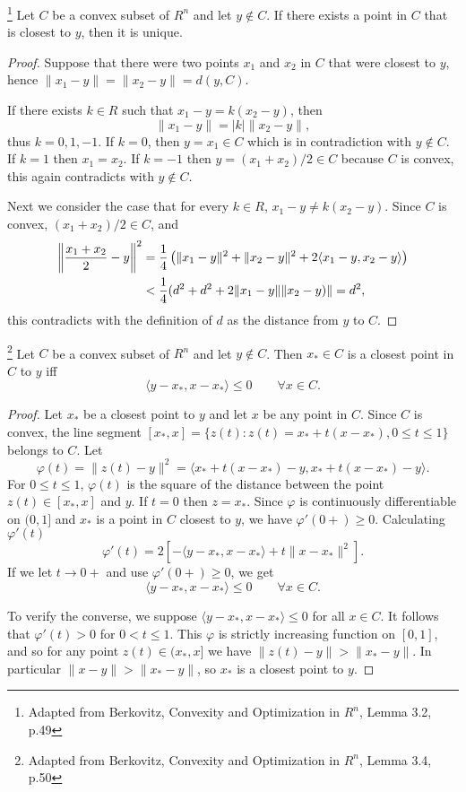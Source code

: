 \begin{lemma}
\footnote{Adapted from Berkovitz, Convexity and Optimization in $R^n$, Lemma
          3.2, p.49}
Let $C$ be a convex subset of $R^n$ and let $y\notin C$. If there exists a 
point in $C$ that is closest to $y$, then it is unique.
\end{lemma}
\begin{proof}
Suppose that there were two points $x_1$ and $x_2$ in $C$ that were closest 
to $y$, hence $\| x_1-y \| = \| x_2-y \| = d(y,C)$.

If there exists $k\in R$ such that $x_1-y=k(x_2-y)$, then
\[
  \| x_1-y \| = |k| \| x_2-y \|,
\]
thus $k=0,1,-1$. If $k=0$, then $y=x_1\in C$ which is in contradiction with
$y\notin C$. If $k=1$ then $x_1=x_2$. If $k=-1$ then $y=(x_1+x_2)/2\in C$ 
because $C$ is convex, this again contradicts with $y\notin C$.

Next we consider the case that for every $k\in R$, $x_1-y\neq k(x_2-y)$.
Since $C$ is convex, $(x_1+x_2)/2\in C$, and
\begin{align*}
  \left\| \frac{x_1+x_2}{2} -y \right\|^2 
    &= \frac{1}{4} \left( \| x_1-y \|^2 + \| x_2-y \|^2 
      + 2\langle x_1-y, x_2-y \rangle \right) \notag \\
    &< \frac{1}{4} ( d^2 + d^2 + 2 \| x_1-y \| \| x_2-y ) \|
    = d^2,  \notag
\end{align*}
this contradicts with the definition of $d$ as the distance from $y$ to $C$.
\end{proof}

\begin{lemma} \label{L:point_close}
\footnote{Adapted from Berkovitz, Convexity and Optimization in $R^n$, Lemma
          3.4, p.50}
Let $C$ be a convex subset of $R^n$ and let $y\notin C$. Then $x_*\in C$ is
a closest point in $C$ to $y$ iff
\[
  \langle y-x_*, x-x_* \rangle \le 0 \qquad \forall x\in C.
\]
\end{lemma}
\begin{proof}
Let $x_*$ be a closest point to $y$ and let $x$ be any point in $C$. Since
$C$ is convex, the line segment
$[x_*,x]=\{z(t):z(t)=x_*+t(x-x_*), 0\le t\le 1\}$
belongs to $C$. Let
\[
  \varphi(t) = \| z(t)-y \|^2 = \langle x_*+t(x-x_*)-y,x_*+t(x-x_*)-y \rangle.
\]
For $0\le t\le 1$, $\varphi(t)$ is the square of the distance between the point
$z(t)\in [x_*,x]$ and $y$. If $t=0$ then $z=x_*$. Since $\varphi$ is 
continuously differentiable on $(0,1]$ and $x_*$ is a point in $C$ closest to
$y$, we have $\varphi'(0+)\ge 0$. Calculating $\varphi'(t)$
\[
  \varphi'(t)=2[-\langle y-x_*,x-x_* \rangle + t\| x-x_* \|^2].
\]
If we let $t\to 0+$ and use $\varphi'(0+)\ge 0$, we get
\[
  \langle y-x_*, x-x_* \rangle \le 0 \qquad \forall x\in C.
\]

To verify the converse, we suppose 
$\langle y-x_*, x-x_* \rangle \le 0$ for all $x\in C$. It follows that 
$\varphi'(t)>0$ for $0<t\le 1$. This $\varphi$ is strictly increasing
function on $[0,1]$, and so for any point $z(t)\in (x_*,x]$ we have
$\| z(t)-y \| > \| x_*-y \|$. In particular $\| x-y \| > \| x_*-y \|$, so
$x_*$ is a closest point to $y$.
\end{proof}


